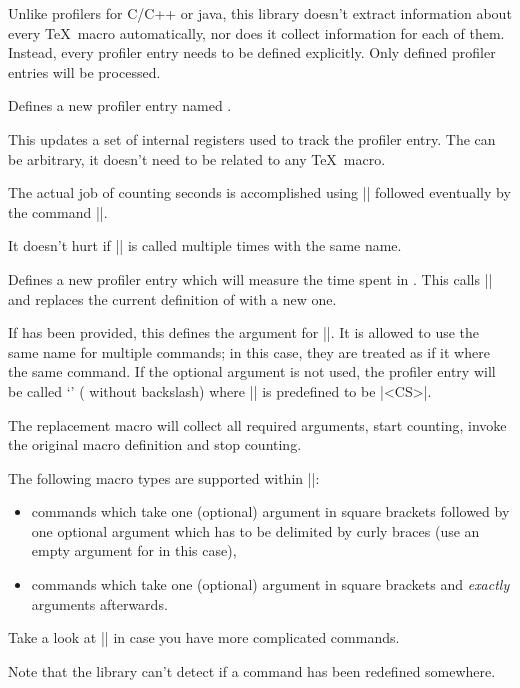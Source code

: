 Unlike profilers for C/C++ or java, this library doesn't extract information
about every \TeX\ macro automatically, nor does it collect information for each
of them. Instead, every profiler entry needs to be defined explicitly. Only
defined profiler entries will be processed.

\begin{command}{\pgfprofilenew{}}
    Defines a new profiler entry named .

    This updates a set of internal registers used to track the profiler entry.
    The  can be arbitrary, it doesn't need to be related to any
    \TeX\ macro.

    The actual job of counting seconds is accomplished using
    |\pgfprofilestart| followed eventually by the command
    |\pgfprofileend|.

    It doesn't hurt if |\pgfprofilenew| is called multiple times with the same
    name.
\end{command}

\begin{command}{\pgfprofilenewforcommand{}}
    Defines a new profiler entry which will measure the time spent in
    . This calls |\pgfprofilenew| and replaces the
    current definition of  with a new one.

    If  has been provided, this defines the argument
    for |\pgfprofilenew|. It is allowed to use the same name for multiple
    commands; in this case, they are treated as if it where the same command.
    If the optional argument is not used, the profiler entry will be called
    `\declareandlabel{\pgfprofilecs}' ( without
    backslash) where |\pgfprofilecs| is predefined to be |<CS>|.

    The replacement macro will collect all required arguments, start counting,
    invoke the original macro definition and stop counting.

    The following macro types are supported within |\pgfprofilenewforcommand|:
    \begin{itemize}
        \item commands which take one (optional) argument in square brackets
            followed by one optional argument which has to be delimited by
            curly braces (use an empty argument for  in this
            case),
        \item commands which take one (optional) argument in square brackets
            and \emph{exactly}  arguments afterwards.
    \end{itemize}

    Take a look at |\pgfprofilenewforcommandpattern| in case you have more
    complicated commands.

    Note that the library can't detect if a command has been redefined
    somewhere.
\end{command}

